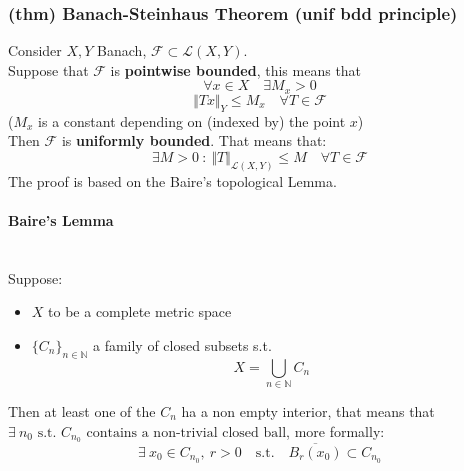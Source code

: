 \subsubsection{(thm) Banach-Steinhaus Theorem (unif
bdd principle)}
Consider $X,Y$ Banach, $\mathcal F\subset \mathcal L(X,Y)$.\\
Suppose that $\mathcal F$ is \textbf{pointwise bounded}, this means that $$\forall x\in X\quad \exists M_x >0 $$
$$\Vert Tx\Vert_Y\leq M_x\quad \forall T\in \mathcal F$$
($M_x$ is a constant depending on (indexed by) the point $x$)\\
Then $\mathcal F$ is \textbf{uniformly bounded}. That means that:
$$\exists M>0 \ :\ \Vert T\Vert_{\mathcal L(X,Y)}\leq M \quad \forall T\in \mathcal F$$
    The proof is based on the Baire's topological Lemma.
    \paragraph{Baire's Lemma}\ \\
    Suppose:
    \begin{itemize}
        \item $X$ to be a complete metric space
        \item $\{C_n\}_{n\in \mathbb N}$ a family of closed subsets s.t.
        $$X=\bigcup_{n\in \mathbb N}C_n$$
    \end{itemize}
    Then at least one of the $C_n$ ha a non empty interior, that means that
    $\exists\ n_0\text{ s.t. } C_{n_0} \text{ contains a non-trivial closed ball}$, more formally:
    $$\exists\ x_0\in C_{n_0}, \ r>0\quad \text{s.t.}\quad \overline{B_r(x_0)}\subset C_{n_0}$$
